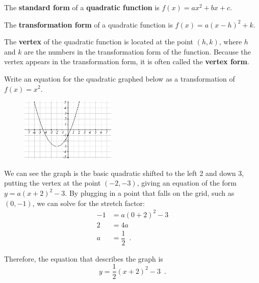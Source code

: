 \begin{definition}
The {\bf standard form} of a {\bf quadratic function} is $f(x)=ax^2+bx+c$.

The {\bf transformation form} of a quadratic function is $f(x)=a(x-h)^2+k$.

The {\bf vertex} of the quadratic function is located at the point $(h,k)$, where $h$ and $k$ are the numbers in the transformation form of the function. Because the vertex appears in the transformation form, it is often called the {\bf vertex form}.
\end{definition}
\begin{example}
Write an equation for the quadratic graphed below as a transformation of $f(x)=x^2$.

\begin{figure}[!ht]
\centering
\includegraphics[width=0.4\textwidth]{img/chap1/sec1-5/image057.png}
\caption{}
\end{figure}
\begin{solution} We can see the graph is the basic quadratic shifted to the left 2 and down 3, putting the vertex at the point $(-2,-3)$, giving an equation of the form $y=a(x+2)^2-3$. By plugging in a point that falls on the grid, such as $(0,-1)$, we can solve for the stretch factor:
\begin{align*}
		-1 &= a(0+2)^2-3 \\
		2  &= 4a \\
		a  &= \dfrac{1}{2} \enspace .
	\end{align*}

Therefore, the equation that describes the graph is
\[ y = \dfrac{1}{2}(x+2)^2-3 \enspace .\]
\end{solution}\end{example}

